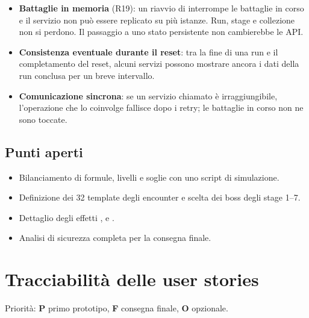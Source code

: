 \documentclass[11pt,a4paper]{article}
\begin{document}
\begin{itemize}
  \item \textbf{Battaglie in memoria} (R19): un riavvio di  interrompe le battaglie in corso e il servizio non può essere replicato su più istanze. Run, stage e collezione non si perdono. Il passaggio a uno stato persistente non cambierebbe le API.
  \item \textbf{Consistenza eventuale durante il reset}: tra la fine di una run e il completamento del reset, alcuni servizi possono mostrare ancora i dati della run conclusa per un breve intervallo.
  \item \textbf{Comunicazione sincrona}: se un servizio chiamato è irraggiungibile, l'operazione che lo coinvolge fallisce dopo i retry; le battaglie in corso non ne sono toccate.
\end{itemize}

\subsection{Punti aperti}

\begin{itemize}
  \item Bilanciamento di formule, livelli e soglie con uno script di simulazione.
  \item Definizione dei 32 template degli encounter e scelta dei boss degli stage 1–7.
  \item Dettaglio degli effetti ,  e .
  \item Analisi di sicurezza completa per la consegna finale.
\end{itemize}

\appendix
\section{Tracciabilità delle user stories}\label{app:tracciabilita}

Priorità: \textbf{P} primo prototipo, \textbf{F} consegna finale, \textbf{O} opzionale.
\end{document}
